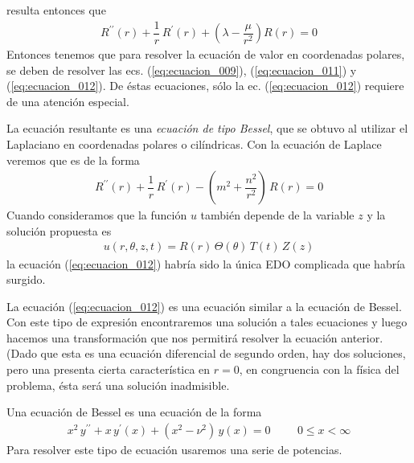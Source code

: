 resulta entonces que
\begin{align}
R^{\prime \prime} (r) + \dfrac{1}{r} \, R^{\prime} (r) + \left( \lambda - \dfrac{\mu}{r^{2}} \right) R (r) = 0
\label{eq:ecuacion_012}
\end{align}
Entonces tenemos que para resolver la ecuación de valor en coordenadas polares, se deben de resolver las ecs. (\ref{eq:ecuacion_009}), (\ref{eq:ecuacion_011}) y (\ref{eq:ecuacion_012}). De éstas ecuaciones, sólo la ec. (\ref{eq:ecuacion_012}) requiere de una atención especial.
\par
La ecuación resultante es una \emph{ecuación de tipo Bessel}, que se obtuvo al utilizar el Laplaciano en coordenadas polares o cilíndricas. Con la ecuación de Laplace veremos que es de la forma
\begin{align*}
R^{\prime \prime} (r) + \dfrac{1}{r} \, R^{\prime} (r) - \left( m^{2} + \dfrac{n^{2}}{r^{2}} \right) \, R (r) = 0
\end{align*}
Cuando consideramos que la función $u$ también depende de la variable $z$ y la solución propuesta es
\begin{align*}
u(r, \theta, z, t) = R(r) \, \Theta (\theta) \, T(t) \, Z (z)
\end{align*}
la ecuación (\ref{eq:ecuacion_012}) habría sido la única EDO complicada que habría surgido.
\par
La ecuación (\ref{eq:ecuacion_012}) es una ecuación similar a la ecuación de Bessel. Con este tipo de expresión encontraremos una solución a tales ecuaciones y luego hacemos una transformación que nos permitirá resolver la ecuación anterior. (Dado que esta es una ecuación diferencial de segundo orden, hay dos soluciones, pero una presenta cierta característica en $r = 0$, en congruencia con la física del problema, ésta será una solución inadmisible.
\par
Una ecuación de Bessel es una ecuación de la forma
\begin{align*}
x^{2} \, y^{\prime \prime} +  x \, y^{\prime} (x) + (x^{2} - \nu^{2}) \, y(x) = 0 \hspace{1cm} 0 \leq x < \infty
\end{align*}
Para resolver este tipo de ecuación usaremos una serie de potencias.
